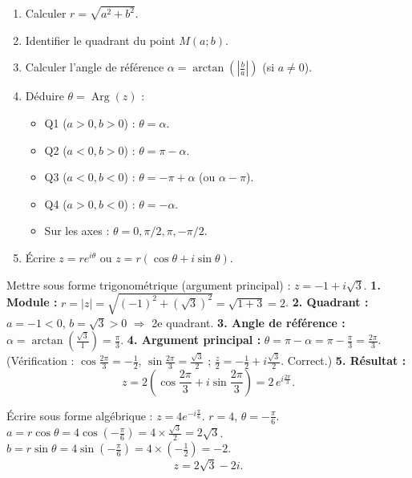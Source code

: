 \documentclass[11pt]{article}
\begin{document}
\begin{methode}
\begin{enumerate}
    \item Calculer $r = \sqrt{a^2+b^2}$.
    \item Identifier le quadrant du point $M(a;b)$.
    \item Calculer l'angle de référence $\alpha = \arctan\left(\left|\frac{b}{a}\right|\right)$ (si $a \neq 0$).
    \item Déduire $\theta = \operatorname{Arg}(z)$ :
    \begin{itemize}
        \item Q1 ($a>0,b>0$) : $\theta = \alpha$.
        \item Q2 ($a<0,b>0$) : $\theta = \pi - \alpha$.
        \item Q3 ($a<0,b<0$) : $\theta = -\pi + \alpha$ (ou $\alpha - \pi$).
        \item Q4 ($a>0,b<0$) : $\theta = -\alpha$.
        \item Sur les axes : $\theta = 0, \pi/2, \pi, -\pi/2$.
    \end{itemize}
    \item Écrire $z = r e^{i\theta}$ ou $z = r(\cos\theta + i\sin\theta)$.
\end{enumerate}
\end{methode}

\begin{exoresolu}
Mettre sous forme trigonométrique (argument principal) : $z = -1 + i\sqrt{3}$.
\tcblower
\textbf{1. Module :} $r = |z| = \sqrt{(-1)^2 + (\sqrt{3})^2} = \sqrt{1+3} = 2$.
\textbf{2. Quadrant :} $a=-1<0$, $b=\sqrt{3}>0$ $\Rightarrow$ 2e quadrant.
\textbf{3. Angle de référence :} $\alpha = \arctan\left(\frac{\sqrt{3}}{1}\right) = \frac{\pi}{3}$.
\textbf{4. Argument principal :} $\theta = \pi - \alpha = \pi - \frac{\pi}{3} = \frac{2\pi}{3}$.
(Vérification : $\cos\frac{2\pi}{3}=-\frac{1}{2}$, $\sin\frac{2\pi}{3}=\frac{\sqrt{3}}{2}$ ; $\frac{z}{2} = -\frac{1}{2}+i\frac{\sqrt{3}}{2}$. Correct.)
\textbf{5. Résultat :}
\[
z = 2\left(\cos\frac{2\pi}{3} + i\sin\frac{2\pi}{3}\right) = 2\,e^{i\frac{2\pi}{3}}.
\]
\end{exoresolu}

\begin{exoresolu}
Écrire sous forme algébrique : $z = 4 e^{-i\frac{\pi}{6}}$.
\tcblower
$r=4$, $\theta = -\frac{\pi}{6}$.
$a = r\cos\theta = 4\cos\left(-\frac{\pi}{6}\right) = 4 \times \frac{\sqrt{3}}{2} = 2\sqrt{3}$.
$b = r\sin\theta = 4\sin\left(-\frac{\pi}{6}\right) = 4 \times \left(-\frac{1}{2}\right) = -2$.
\[
z = 2\sqrt{3} - 2i.
\]
\end{exoresolu}
\end{document}
